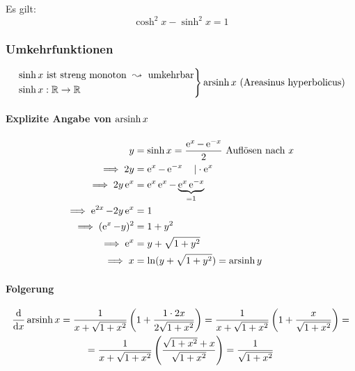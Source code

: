 
Es gilt:
\begin{equation*}
	\cosh^2 x - \sinh^2 x = 1
\end{equation*}

\subsubsection*{Umkehrfunktionen}

\begin{equation*}
	\left.
	\begin{aligned}
		&\sinh x \text{ ist streng monoton } \leadsto \text{ umkehrbar} \\
		&\sinh x : \mathbb{R} \rightarrow \mathbb{R}
	\end{aligned}
	\right\} \operatorname{arsinh} x \text{ (Areasinus hyperbolicus)}
\end{equation*}

\paragraph{Explizite Angabe von $\operatorname{arsinh} x$}
\begin{align*}
	y &= \sinh x = \frac{\operatorname{e}^x - \operatorname{e}^{-x}}{2} \text{ Auflösen nach $x$}\\
	\implies 2y &= \operatorname{e}^x - \operatorname{e}^{-x} \quad| \cdot \operatorname{e}^x \\
	\implies 2y \operatorname{e}^x &= \operatorname{e}^x \operatorname{e}^x - \underbrace{\operatorname{e}^x \operatorname{e}^{-x}}_{=1} \\
	\implies \operatorname{e}^{2x} - 2y\operatorname{e}^x &= 1 \\
	\implies (\operatorname{e}^x - y)^2 &= 1 + y^2 \\
	\implies \operatorname{e}^x &= y + \sqrt{1 + y^2} \\
	\implies x &= \ln (y + \sqrt{1 + y^2}) = \operatorname{arsinh} y
\end{align*}

\paragraph{Folgerung}
\begin{multline*}
	\frac{\mathrm d}{\mathrm d x} \operatorname{arsinh} x = \frac{1}{x + \sqrt{1 + x^2}}\left(1 + \frac{1 \cdot 2x}{2\sqrt{1 + x^2}}\right) = \frac{1}{x + \sqrt{1 + x^2}} \left(1 + \frac{x}{\sqrt{1 + x^2}} \right) = \\
	= \frac{1}{x + \sqrt{1 + x^2}} \left(\frac{\sqrt{1 + x^2} + x}{\sqrt{1 + x^2}}\right) = \frac{1}{\sqrt{1 + x^2}}
\end{multline*}

